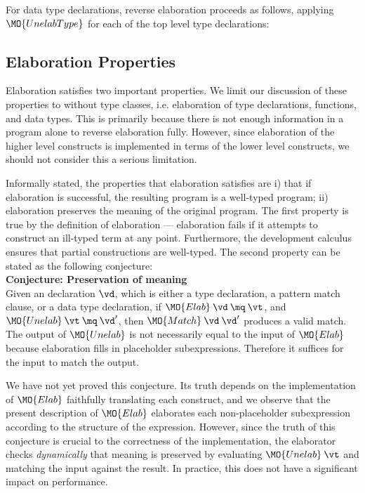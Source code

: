 \noindent
For data type declarations, reverse elaboration proceeds as follows, applying $\MO{UnelabType}$
for each of the top level type declarations:



\subsection{Elaboration Properties}

Elaboration satisfies two important properties. We limit our discussion of
these properties to \IdrisM{} without type classes, i.e. elaboration of type 
declarations, functions, and data types. This is primarily because there is not
enough information in a \TT{} program alone to reverse elaboration fully. However, since
elaboration of the higher level \Idris{} constructs is implemented in terms of
the lower level \IdrisM{} constructs, we should not consider this a serious
limitation.

Informally stated, the properties that elaboration satisfies are
i) that if elaboration is successful, the
resulting program is a well-typed \TT{} program; ii) elaboration preserves the
meaning of the original \Idris{} program. The first property is true by the
definition of elaboration --- elaboration fails if it attempts to construct an ill-typed
term at any point. Furthermore, the development calculus \TTdev{} ensures that 
partial constructions are well-typed.
The second property can be stated as the following conjecture:
\\

\noindent
\textbf{Conjecture: Preservation of meaning}\\
Given an \IdrisM{} declaration $\vd$, which is either a type declaration, a
pattern match clause, or a data type declaration,
if $\MO{Elab}\:\vd\:\mq\:\vt$, and $\MO{Unelab}\:\vt\:\mq\:\vd'$,
then $\MO{Match}\:\vd\:\vd'$ produces a valid match.
\\

The output of $\MO{Unelab}$ is not necessarily equal to the input of $\MO{Elab}$
because elaboration fills in placeholder subexpressions. Therefore it suffices for
the input to match the output.

We have not yet proved this conjecture. Its truth depends on the implementation
of $\MO{Elab}$ faithfully translating each construct, and we observe that the
present description of $\MO{Elab}$ elaborates each non-placeholder subexpression
according to the structure of the expression. However, since the truth of this
conjecture is crucial to the correctness of the implementation, the elaborator
checks \emph{dynamically} that meaning is preserved by evaluating
$\MO{Unelab}\:\vt$ and matching the input against the result. In practice, this
does not have a significant impact on performance.

